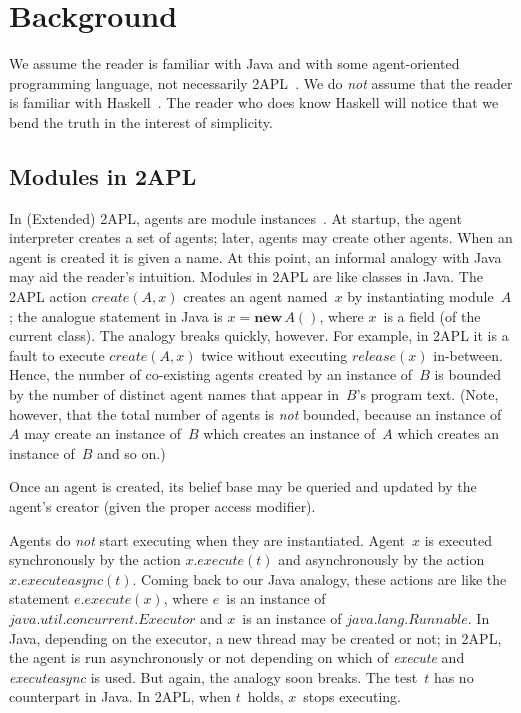 \documentclass[conference,compsoc]{IEEEtran} %
\begin{document}
\section{Background} %

We assume the reader is familiar with Java and with some agent-oriented
programming language, not necessarily
2APL~\cite{DBLP:journals/aamas/Dastani08}. We do \emph{not} assume that the
reader is familiar with Haskell~\cite{web:haskell}. The reader who does
know Haskell will notice that we bend the truth in the interest of
simplicity.

\subsection{Modules in 2APL} %

In (Extended) 2APL, agents are module
instances~\cite{DBLP:conf/prima/DastaniMS08}. At startup, the agent
interpreter creates a set of agents; later, agents may create other agents.
When an agent is created it is given a name.  At this point, an informal
analogy with Java may aid the reader's intuition. Modules in 2APL are like
classes in Java. The 2APL action $\mathit{create}(A,x)$ creates an agent
named~$x$ by instantiating module~$A$; the analogue statement in Java is
$x=\mathbf{new}\,A()$, where $x$~is a field (of the current class).  The
analogy breaks quickly, however. For example, in 2APL it is a fault to
execute $\mathit{create}(A,x)$ twice without executing
$\mathit{release}(x)$ in-between. Hence, the number of co-existing agents
created by an instance of~$B$ is bounded by the number of distinct agent
names that appear in~$B$'s program text. (Note, however, that the total
number of agents is \emph{not} bounded, because an instance of~$A$ may
create an instance of~$B$ which creates an instance of~$A$ which creates an
instance of~$B$ and so on.)

Once an agent is created, its belief base may be queried and updated by the
agent's creator (given the proper access modifier).

Agents do \emph{not} start executing when they are instantiated. Agent~$x$
is executed synchronously by the action $x.\mathit{execute}(t)$ and
asynchronously by the action $x.\mathit{executeasync}(t)$. Coming back to
our Java analogy, these actions are like the statement
$e.\mathit{execute}(x)$, where $e$~is an instance of
$\mathit{java}.\mathit{util}.\mathit{concurrent}.\mathit{Executor}$ and
$x$~is an instance of $\mathit{java}.\mathit{lang}.\mathit{Runnable}$.  In
Java, depending on the executor, a new thread may be created or not; in
2APL, the agent is run asynchronously or not depending on which of
\textit{execute} and \textit{executeasync} is used. But again, the analogy
soon breaks. The test~$t$ has no counterpart in Java. In 2APL, when
$t$~holds, $x$~stops executing.
\end{document}

